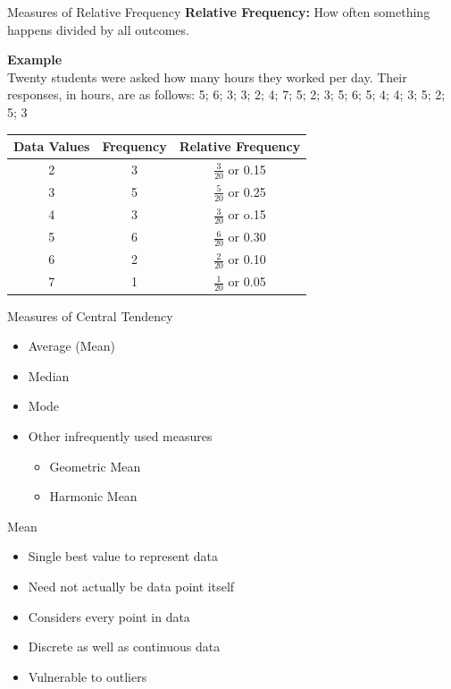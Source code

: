 \documentclass[10pt,dvipsnames, aspectratio=169]{beamer}
\begin{document}
\begin{frame}[t]{Measures of Relative Frequency}
	\textbf{Relative Frequency:} How often something happens divided by all 
	outcomes.
	
	\textbf{Example} \\ 
	Twenty students were asked how many hours they worked per day.
	Their responses, in hours,
	are as follows: 5; 6; 3; 3; 2; 4; 7; 5; 2; 3; 5; 6; 5; 4; 4; 3; 5; 2; 
	5; 3
	\begin{center}
		\begin{tabular}{|c|c|c|} 
			\hline 
			Data Values & Frequency & Relative Frequency \\ 
			\hline 
			2 & 3 & $\frac{3}{20}$ or 0.15 \\ 
			\hline 
			3 & 5 &  $\frac{5}{20}$ or 0.25\\
			\hline  
			4 & 3 &  $\frac{3}{20}$ or o.15\\
			\hline  
			5 & 6 &  $\frac{6}{20}$ or 0.30\\
			\hline  
			6 & 2 &  $\frac{2}{20}$ or 0.10 \\
			\hline 
			7 & 1 &  $\frac{1}{20}$ or 0.05\\
			\hline 
		\end{tabular}
	\end{center}
\end{frame}
\begin{frame}[t]{Measures of Central Tendency}
	\begin{itemize}
		\item Average (Mean)
		\item Median
		\item Mode
		\item Other infrequently used measures
		\begin{itemize}
			\item Geometric Mean
			\item Harmonic Mean
		\end{itemize}
	\end{itemize}
\end{frame}
\begin{frame}[t]{Mean}
	\begin{itemize}
		\item Single best value to represent data
		\item Need not actually be data point itself
		\item Considers every point in data
		\item Discrete as well as continuous data
		\item Vulnerable to outliers
	\end{itemize}
\end{frame}
\end{document}

